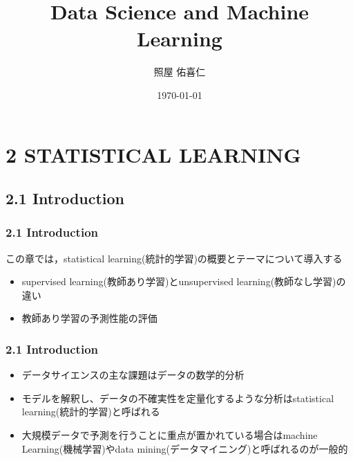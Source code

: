 \documentclass[dvipdfmx,cjk]{beamer}
\theoremstyle{example}
\begin{document}
\title[]{Data Science and Machine Learning}
\author[]{照屋 佑喜仁}
\institute[]{}
\date{\today}

\begin{frame}
    \titlepage
\end{frame}

\begin{frame}
    \tableofcontents
\end{frame}

\section{2 STATISTICAL LEARNING}
\subsection{2.1 Introduction}
\begin{frame}
    \frametitle{2.1 Introduction} %
    この章では，statistical learning(統計的学習)の概要とテーマについて導入する
    \begin{itemize}
        \item supervised learning(教師あり学習)とunsupervised learning(教師なし学習)の違い
        \item 教師あり学習の予測性能の評価
    \end{itemize}
\end{frame}

\begin{frame}
    \frametitle{2.1 Introduction}
    \begin{itemize}
        \item データサイエンスの主な課題はデータの数学的分析
        \item モデルを解釈し、データの不確実性を定量化するような分析は\alert{statistical learning}(統計的学習)と呼ばれる
        \item 大規模データで予測を行うことに重点が置かれている場合はmachine Learning(機械学習)やdata mining(データマイニング)と呼ばれるのが一般的
    \end{itemize}
\end{frame}
\end{document}
